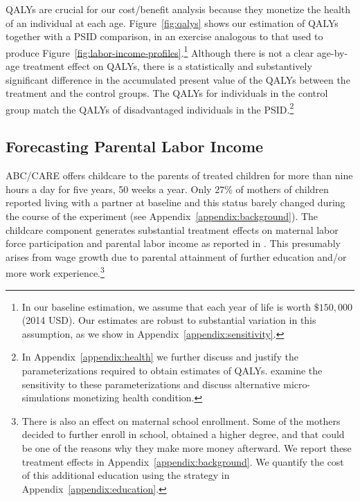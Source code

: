 QALYs are crucial for our cost/benefit analysis because they monetize the health of an individual at each age. Figure~\ref{fig:qalys} shows our estimation of QALYs together with a PSID comparison, in an exercise analogous to that used to produce Figure~\ref{fig:labor-income-profiles}.\footnote{In our baseline estimation, we assume that each year of life is worth  $\$150,000$ (2014 USD). Our estimates are robust to substantial variation in this assumption, as we show in  Appendix~\ref{appendix:sensitivity}.} Although there is not a clear age-by-age treatment effect on QALYs, there is a statistically and substantively significant difference in the accumulated present value of the QALYs between the treatment and the control groups. The QALYs for individuals in the control group match the QALYs of disadvantaged individuals in the PSID.\footnote{In  Appendix~\ref{appendix:health} we further discuss and justify the parameterizations required to obtain estimates of QALYs. \citet{Goldman_etal_2015_Future-America-Model} examine the sensitivity to these parameterizations and discuss alternative micro-simulations monetizing health condition.}

\subsection{Forecasting Parental Labor Income} \label{section:pincome}

ABC/CARE offers childcare to the parents of treated children for more than nine hours a day for five years, 50 weeks a year. Only $27\%$ of mothers of children reported living with a partner at baseline and this status barely changed during the course of the experiment (see Appendix~\ref{appendix:background}). The childcare component generates substantial treatment effects on maternal labor force participation and parental labor income as reported in \cite{Garcia_Heckman_Ziff_2017_Gender-Diff_UNPUBLISHED}. This presumably arises from wage growth due to parental attainment of further education and/or more work experience.\footnote{There is also an effect on maternal school enrollment. Some of the mothers decided to further enroll in school, obtained a higher degree, and that could be one of the reasons why they make more money afterward. We report these treatment effects in Appendix~\ref{appendix:background}. We quantify the cost of this additional education using the strategy in Appendix~\ref{appendix:education}.}

